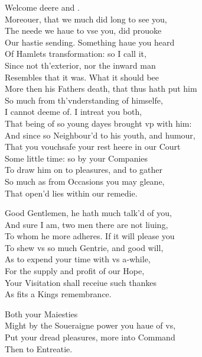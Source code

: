 \documentclass[a5paper,DIV=calc,11pt]{scrbook}
\begin{document}
\begin{drama*}
    \kingspeaks Welcome deere \rosin and \guil.\\
    Moreouer, that we much did long to see you,\\
    The neede we haue to vse you, did prouoke\\
    Our hastie sending. Something haue you heard\\
    Of Hamlets transformation: so I call it,\\
    Since not th'exterior, nor the inward man\\
    Resembles that it was. What it should bee\\
    More then his Fathers death, that thus hath put him\\
    So much from th'vnderstanding of himselfe,\\
    I cannot deeme of. I intreat you both,\\
    That being of so young dayes brought vp with him:\\
    And since so Neighbour'd to his youth, and humour,\\
    That you vouchsafe your rest heere in our Court\\
    Some little time: so by your Companies\\
    To draw him on to pleasures, and to gather\\
    So much as from Occasions you may gleane,\\
    That open'd lies within our remedie.
    
    \queenspeaks Good Gentlemen, he hath much talk'd of you,\\
    And sure I am, two men there are not liuing,\\
    To whom he more adheres. If it will please you\\
    To shew vs so much Gentrie, and good will,\\
    As to expend your time with vs a‑while,\\
    For the supply and profit of our Hope,\\
    Your Visitation shall receiue such thankes\\
    As fits a Kings remembrance.
    
    \rosinspeaks Both your Maiesties\\
    Might by the Soueraigne power you haue of vs,\\
    Put your dread pleasures, more into Command\\
    Then to Entreatie.
    

\end{drama*}
\end{document}

